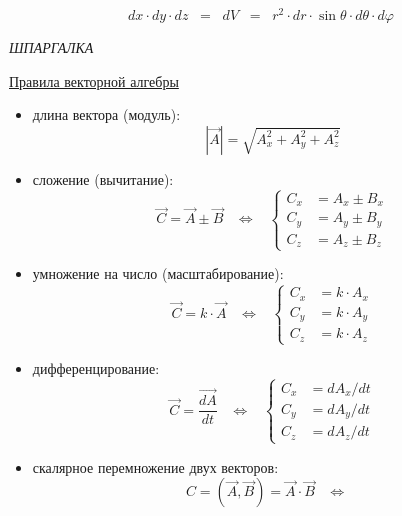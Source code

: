\documentclass[12pt,epsfig,color,russian]{article}
\begin{document}
 \begin{displaymath}
dx\cdot dy\cdot dz\;\;=\;\;dV\;\;=\;\;r^2\cdot dr\cdot\sin\theta\cdot d\theta\cdot d\varphi
 \end{displaymath}


\newpage
\begin{flushright}
{\color{green}\LARGE\sl ШПАРГАЛКА}
\end{flushright}
\centerline{\huge\underline{Правила векторной алгебры}}
\begin{itemize}
\item длина вектора (модуль):
 \begin{displaymath}
 |\vec{A}| = \sqrt{A_x^2+A_y^2+A_z^2}
 \end{displaymath}
\item сложение (вычитание):
 \begin{displaymath}
 \vec{C} = \vec{A} \pm \vec{B}\;\;\;\Leftrightarrow\;\;\;
 \left\{\begin{array}{cc}C_x &= A_x\pm B_x\\
                         C_y &= A_y\pm B_y\\
                         C_z &= A_z\pm B_z\end{array}\right.
 \end{displaymath}
\item умножение на число (масштабирование):
 \begin{displaymath}
 \vec{C} = k\cdot\vec{A} \;\;\;\Leftrightarrow\;\;\;
 \left\{\begin{array}{cc}C_x &= k\cdot A_x\\
                         C_y &= k\cdot A_y\\
                         C_z &= k\cdot A_z\end{array}\right.
 \end{displaymath}
\item дифференцирование:
 \begin{displaymath}
 \vec{C} = \frac{\vec{dA}}{dt} \;\;\;\Leftrightarrow\;\;\;
 \left\{\begin{array}{cc}C_x &= {dA_x}/{dt}\\
                         C_y &= {dA_y}/{dt}\\
                         C_z &= {dA_z}/{dt}\end{array}\right.
 \end{displaymath}
\item скалярное перемножение двух векторов:
 \begin{displaymath}
 C = \left(\vec{A},\vec{B}\right) = \vec{A}\cdot\vec{B}\;\;\;\Leftrightarrow\;\;\;

\end{displaymath}
\end{itemize}
\end{document}
